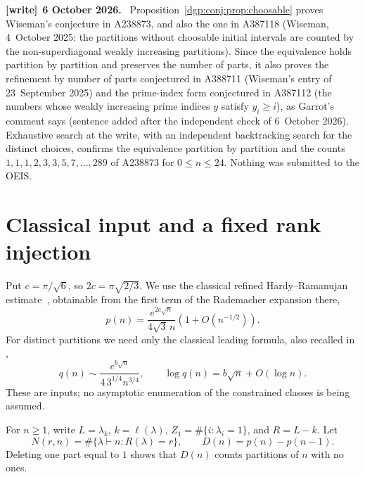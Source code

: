\documentclass[11pt,letterpaper]{article}
\numberwithin{equation}{section}
\theoremstyle{remark}\newtheorem{remark}[theorem]{Remark}
\newenvironment{writenote}[1][]{\par\smallskip\begingroup\small
 \noindent\textbf{[write]}\if\relax\detokenize{#1}\relax\else~\textbf{#1.}\fi\ }%
 {\par\endgroup\smallskip}
\begin{document}
\begin{writenote}[6 October 2026]
Proposition~\ref{dgp:conj:prop:choosable} proves Wiseman's conjecture in A238873, and also the one in A387118 (Wiseman, 4~October 2025: the partitions without choosable initial intervals are counted by the non-superdiagonal weakly increasing partitions). Since the equivalence holds partition by partition and preserves the number of parts, it also proves the refinement by number of parts conjectured in A388711 (Wiseman's entry of 23~September 2025) and the prime-index form conjectured in A387112 \cite{oeisA387112} (the numbers whose weakly increasing prime indices $y$ satisfy $y_i\ge i$), as Garrot's comment says \textup{(sentence added after the independent check of 6~October 2026)}. Exhaustive search at the write, with an independent backtracking search for the distinct choices, confirms the equivalence partition by partition and the counts $1,1,1,2,3,3,5,7,\dots,289$ of A238873 for $0\le n\le24$. Nothing was submitted to the OEIS.
\end{writenote}

\section{Classical input and a fixed rank injection}\label{dgp:conj:sec:rank}
Put $c=\pi/\sqrt6$, so $2c=\pi\sqrt{2/3}$. We use the classical
refined Hardy--Ramanujan estimate~\cite{dlmfpart}, obtainable from
the first term of the Rademacher expansion there,
\begin{equation}\label{dgp:conj:eq:hr}
 p(n)=\frac{e^{2c\sqrt n}}{4\sqrt3\,n}
       \left(1+O(n^{-1/2})\right).
\end{equation}
For distinct partitions we need only the classical leading
formula, also recalled in \cite[Section~5.2]{abek},
\begin{equation}\label{dgp:conj:eq:distinct}
 q(n)\sim\frac{e^{b\sqrt n}}{4\,3^{1/4}n^{3/4}},
 \qquad \log q(n)=b\sqrt n+O(\log n).
\end{equation}
These are inputs; no asymptotic enumeration of the constrained
classes is being assumed.

For $n\geq1$, write $L=\lambda_k$, $k=\ell(\lambda)$,
$Z_1=\#\{i:\lambda_i=1\}$, and $R=L-k$. Let
\[
 N(r,n)=\#\{\lambda\vdash n:R(\lambda)=r\},\qquad
 D(n)=p(n)-p(n-1).
\]
Deleting one part equal to $1$ shows that $D(n)$ counts partitions
of $n$ with no ones.
\end{document}
